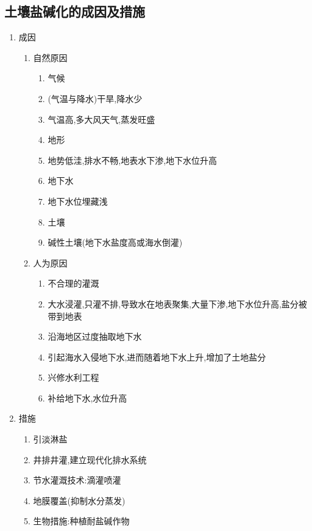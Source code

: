 \documentclass[a4paper]{article}
\begin{document}
    \subsection{土壤盐碱化的成因及措施}
    \begin{enumerate}
        \item 成因
        \begin{enumerate}
            \item 自然原因
            \begin{enumerate}
                \item 气候
                    \item (气温与降水)干旱,降水少
                    \item 气温高,多大风天气,蒸发旺盛
                \item 地形
                    \item 地势低洼,排水不畅,地表水下渗,地下水位升高
                \item 地下水
                    \item 地下水位埋藏浅
                \item 土壤
                    \item 碱性土壤(地下水盐度高或海水倒灌)
            \end{enumerate}
            \item 人为原因
            \begin{enumerate}
                \item 不合理的灌溉
                    \item 大水浸灌,只灌不排,导致水在地表聚集,大量下渗,地下水位升高,盐分被带到地表
                \item 沿海地区过度抽取地下水
                    \item 引起海水入侵地下水,进而随着地下水上升,增加了土地盐分
                \item 兴修水利工程
                    \item 补给地下水,水位升高
            \end{enumerate}
        \end{enumerate}
        \item 措施
        \begin{enumerate}
            \item 引淡淋盐
            \item 井排井灌,建立现代化排水系统
            \item 节水灌溉技术:滴灌喷灌
            \item 地膜覆盖(抑制水分蒸发)
            \item 生物措施:种植耐盐碱作物
        \end{enumerate}
    \end{enumerate}
\end{document}
